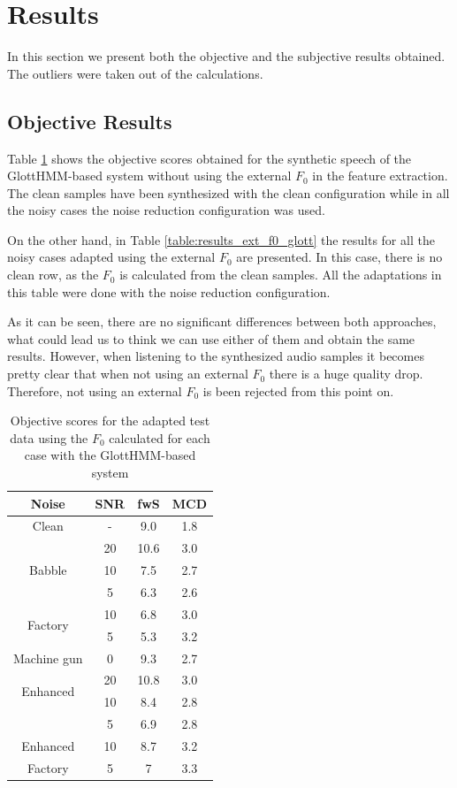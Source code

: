 \section{Results}
\label{results}
In this section we present both the objective and the subjective results obtained. The outliers were taken out of the calculations.

\subsection{Objective Results}
\label{results_objective}
Table \ref{table:results_no_ext_f0_glott} shows the objective scores obtained for the synthetic speech of the GlottHMM-based system without using the external $F_{0}$ in the feature extraction.
%
The clean samples have been synthesized with the clean configuration while in all the noisy cases the noise reduction configuration was used. 

On the other hand, in Table \ref{table:results_ext_f0_glott} the results for all the noisy cases adapted using the external $F_{0}$ are presented.
%
In this case, there is no clean row, as the $F_{0}$ is calculated from the clean samples.
%
All the adaptations in this table were done with the noise reduction configuration.

As it can be seen, there are no significant differences between both approaches, what could lead us to think we can use either of them and obtain the same results.
%
However, when listening to the synthesized audio samples it becomes pretty clear that when not using an external $F_{0}$ there is a huge quality drop.
%
Therefore, not using an external $F_{0}$ is been rejected from this point on.

\begin{table}[!htb]
\begin{center}
\begin{tabular}{c c | c | c}
Noise & SNR & fwS & MCD\\
\midrule
\midrule
Clean & - & 9.0 & 1.8\\
\midrule
\multirow{3}{*}{Babble} & 20 & 10.6 & 3.0\\
 & 10 & 7.5 & 2.7\\
 & 5 & 6.3 & 2.6\\
\midrule
\multirow{2}{*}{Factory} & 10 & 6.8 & 3.0\\
 & 5 & 5.3 & 3.2\\
\midrule
Machine gun & 0 & 9.3 & 2.7\\
\midrule
\midrule
\multirow{2}{*}{Enhanced} & 20 & 10.8 & 3.0\\
\multirow{2}{*}{Babble} & 10 & 8.4 & 2.8\\
& 5 & 6.9 & 2.8\\
\midrule
Enhanced & 10 & 8.7 & 3.2\\
Factory & 5 & 7 & 3.3\\
\bottomrule
\end{tabular}
\caption{Objective scores for the adapted test data using the $F_{0}$ calculated for each case with the GlottHMM-based system}
\label{table:results_no_ext_f0_glott}
\end{center}
\end{table}

